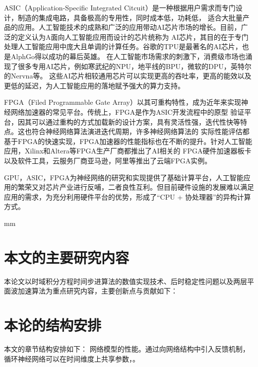 ASIC（Application-Specific Integrated Citcuit）是一种根据用户需求而专门设计，制造的集成电路，具备极高的专用性，同时成本低，功耗低，
适合大批量产品的应用。人工智能技术的成熟和广泛的应用带动AI芯片市场的增长。目前，广泛的定义认为A面向人工智能应用而设计的芯片统称为
AI芯片，其目的在于专门处理人工智能应用中庞大且单调的计算任务。谷歌的TPU是最著名的AI芯片，也是AlphGo得以成功的幕后英雄。
在人工智能市场需求的刺激下，消费级市场也涌现了很多专用AI芯片，例如寒武纪的NPU，地平线的BPU，微软的DPU，英特尔的Nervna等。
这些AI芯片相较通用芯片可以实现更高的吞吐率，更高的能效以及更低的延迟，为人工智能应用的落地赋予强大的算力支持。

FPGA（Filed Programmable Gate Array）以其可重构特性，成为近年来实现神经网络加速器的常见平台。传统上，FPGA是作为ASIC开发流程中的原型
验证平台，因其可以通过重构的方式加载新的设计方案，具有灵活性强，迭代性快等特点。这也符合神经网络算法演进迭代周期，许多神经网络算法的
实际性能评估都基于FPGA的快速实现，FPGA加速器的性能指标也在不断的提升。针对人工智能应用，Xilinx和Altera等FPGA生产厂商都推出了AI相关的
FPGA硬件加速器板卡以及软件工具，云服务厂商亚马逊，阿里等推出了云端FPGA实例。

GPU，ASIC，FPGA为神经网络的研究和实现提供了基础计算平台，人工智能应用的繁荣又对芯片产业进行反哺，二者良性互利。但目前硬件设施的发展难以满足
应用的需求，为充分利用硬件平台的优势，形成了“CPU + 协处理器”的异构计算方式。


mm
\section{本文的主要研究内容}
本论文以时域积分方程时间步进算法的数值实现技术、后时稳定性问题以及两层平面波加速算法为重点研究内容，主要创新点与贡献如下：

\section{本论的结构安排}
本文的章节结构安排如下：
网络模型的性能。通过向网络结构中引入反馈机制，循环神经网络可以在时间维度上共享参数，。
